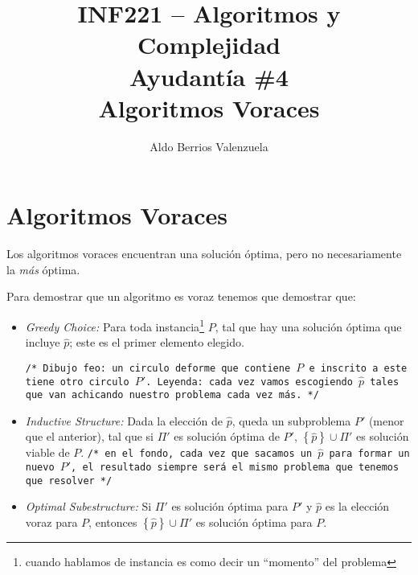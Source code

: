 \documentclass[english, spanish, fleqn, 10pt]{article}
\author{Aldo Berrios Valenzuela}
\title{INF221 -- Algoritmos y Complejidad\\[.4\baselineskip]Ayudantía \#4\\Algoritmos Voraces}
\newcommand{\comillas}[1]{``#1''}
\newcommand{\comentarioc}[1]{\texttt{\textcolor{webred}{/* #1 */}}}
\numberwithin{equation}{section}
\newcommand{\llaves}[1]{\left \{ #1 \right \}}
\theoremstyle{definition}
\begin{document}
\maketitle
\section{Algoritmos Voraces}
Los algoritmos voraces encuentran una solución óptima, pero no necesariamente la \emph{más} óptima.

Para demostrar que un algoritmo es voraz tenemos que demostrar que:
\begin{itemize}
	\item \emph{Greedy Choice:} Para toda instancia\footnote{cuando hablamos de instancia es como decir un \comillas{momento} del problema} $P$, tal que hay una solución óptima que incluye $\hat p$; este es el primer elemento elegido.
	\begin{center}
		\comentarioc{Dibujo feo: un circulo deforme que contiene $P$ e inscrito a este tiene otro circulo $P'$. Leyenda: cada vez vamos escogiendo $\hat{p}$ tales que van achicando nuestro problema cada vez más.}
	\end{center}
	
	\item \emph{Inductive Structure:} Dada la elección de $\hat p$, queda un subproblema $P'$ (menor que el anterior), tal que si $\Pi'$ es solución óptima de $P'$, $\llaves{\hat p}\cup \Pi'$ es solución viable de $P$. \comentarioc{en el fondo, cada vez que sacamos un $\hat p$ para formar un nuevo $P'$, el resultado siempre será el mismo problema que tenemos que resolver}
	
	\item \emph{Optimal Subestructure:} Si $\Pi'$ es solución óptima para $P'$ y $\hat p$ es la elección voraz para $P$, entonces $\llaves{\hat p}\cup \Pi'$ es solución óptima para $P$.
\end{itemize}
\end{document}
